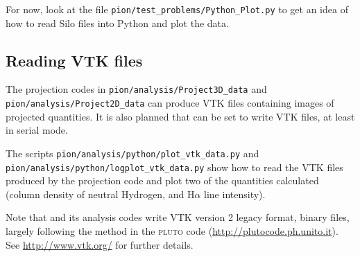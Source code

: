 \documentclass[a4paper,11pt]{report}
\begin{document}
For now, look at the file \lstinline{pion/test_problems/Python_Plot.py} to get an idea of how to read Silo files into Python and plot the data.

\subsection{Reading VTK files}
The projection codes in \lstinline{pion/analysis/Project3D_data} and \lstinline{pion/analysis/Project2D_data} can produce VTK files containing images of projected quantities.
It is also planned that \pion{} can be set to write VTK files, at least in serial mode.

The scripts \lstinline{pion/analysis/python/plot_vtk_data.py} and \lstinline{pion/analysis/python/logplot_vtk_data.py} show how to read the VTK files produced by the projection code and plot two of the quantities calculated (column density of neutral Hydrogen, and H$\alpha$ line intensity).

Note that \pion{} and its analysis codes write VTK version 2 legacy format, binary files, largely following the method in the \textsc{pluto} code (\href{http://plutocode.ph.unito.it}{http://plutocode.ph.unito.it}).
See \href{http://www.vtk.org/}{http://www.vtk.org/} for further details.







%

\end{document}
